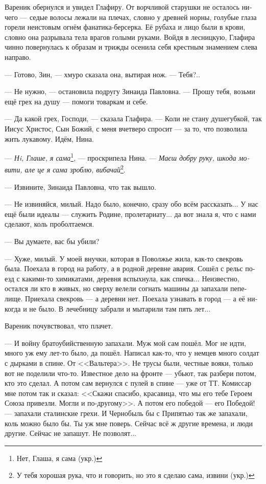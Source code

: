 \documentclass[a5paper,12pt,fleqn]{extbook}\usepackage{cooltooltips}\usepackage{polyglossia}\setdefaultlanguage[babelshorthands=true]{russian}\setotherlanguage{english}\defaultfontfeatures{Ligatures=TeX,Mapping=tex-text} \usepackage{xcolor}\definecolor{lightgray}{HTML}{bbbbbb}\color{lightgray}\newcommand{\ml}[3]{\textenglish{\textcolor{black}{#3}}}
\newcommand{\asterism}{\vspace{1em}{\centering\Large\bfseries$\ast~\ast~\ast$\par}\vspace{1em}}
\newcommand{\textspace}{\vspace{1em}{\centering\Large\bfseries<...>\par}\vspace{1em}}
\begin{document}
\asterism

\textspace

Вареник обернулся и увидел Глафиру.
От ворчливой старушки не осталось ничего --- седые волосы лежали на плечах, словно у древней норны, голубые глаза горели неистовым огнём фанатика-берсерка.
Её рубаха и лицо были в крови, словно она разрывала тела врагов голыми руками.
Войдя в лесницкую, Глафира чинно повернулась к образам и трижды осенила себя крестным знамением слева направо.

--- Готово, Зин, --- хмуро сказала она, вытирая нож.
--- Тебя?..

--- Не нужно, --- остановила подругу Зинаида Павловна.
--- Прошу тебя, возьми ещё грех на душу --- помоги товаркам и себе.

--- Да какой грех, Господи, --- сказала Глафира.
--- Коли не стану душегубкой, так Иисус Христос, Сын Божий, с меня вчетверо спросит --- за то, что позволила жить лукавому.
Идём, Нина.

--- \textit{Нi, Глаше, я сама}\footnote{Нет, Глаша, я сама (укр.)}, --- проскрипела Нина.
--- \textit{Маєш добру руку, шкода мовити, але це я сама зроблю, вибачай}\footnote{У тебя хорошая рука, что и говорить, но это я сделаю сама, извини (укр.)}.

\asterism

\textspace

--- Извините, Зинаида Павловна, что так вышло.

--- Не извиняйся, милый.
Надо было, конечно, сразу обо всём рассказать...
У нас ещё были идеалы --- служить Родине, пролетариату... да вот знала я, что с нами сделают, коль проболтаемся.

--- Вы думаете, вас бы убили?

--- Хуже, милый.
У моей внучки, которая в Поволжье жила, как-то свекровь была.
Поехала в город на работу, а в родной деревне авария.
Сошёл с рельс поезд с какими-то химикатами, деревня вспыхнула, как спичка...
Неизвестно, остался ли кто в живых, но сверху велели согнать машины да запахали пепелище.
Приехала свекровь --- а деревни нет.
Поехала узнавать в город --- а её никогда и не было.
В лечебницу забрали и мытарили там пять лет...

Вареник почувствовал, что плачет.

--- И войну братоубийственную запахали.
Муж мой сам пошёл.
Мог не идти, много уж ему лет-то было, да пошёл.
Написал как-то, что у немцев много солдат с дырками в спине.
От <<Вальтера>>.
Не трусы были, честные вояки, только вот не поделили что-то.
Известное дело на фронте --- убьют, так разбери потом, кто это сделал.
А потом сам вернулся с пулей в спине --- уже от ТТ.
Комиссар мне потом так и сказал: <<Скажи спасибо, красавица, что мы его тебе Героем Союза привезли.
Могли и по-другому>>.
А потом его победой --- его Победой! --- запахали сталинские грехи.
И Чернобыль бы с Припятью так же запахали, коль можно было бы.
Ты уж мне поверь.
Сейчас всё ж другие времена, и люди другие.
Сейчас не запашут.
Не позволят...
\end{document}
